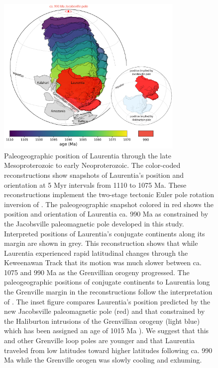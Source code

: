 \documentclass[draft]{agujournal2019}
\begin{document}
\begin{figure}[h!]
\centering
\includegraphics[width=0.8\textwidth]{Jacobsville_paleogeography.pdf}
\caption{Paleogeographic position of Laurentia through the late Mesoproterozoic to early Neoproterozoic. The color-coded reconstructions show snapshots of Laurentia's position and orientation at 5 Myr intervals from 1110 to 1075 Ma. These reconstructions implement the two-stage tectonic Euler pole rotation inversion of . The paleogeographic snapshot colored in red shows the position and orientation of Laurentia ca. 990 Ma as constrained by the Jacobsville paleomagnetic pole developed in this study. Interpreted positions of Laurentia's conjugate continents along its margin are shown in grey. This reconstruction shows that while Laurentia experienced rapid latitudinal changes through the Keweenawan Track that its motion was much slower between ca. 1075 and 990 Ma as the Grenvillian orogeny progressed. The paleogeographic positions of conjugate continents to Laurentia long the Grenville margin in the reconstructions follow the interpretation of . The inset figure compares Laurentia's position predicted by the new Jacobsville paleomagnetic pole (red) and that constrained by the Haliburton intrusions of the Grenvillian orogeny (light blue) which has been assigned an age of 1015 Ma \cite{Warnock2000a}). We suggest that this and other Grenville loop poles are younger and that Laurentia traveled from low latitudes toward higher latitudes following ca. 990 Ma while the Grenville orogen was slowly cooling and exhuming.}
\label{fig:paleogeography}
\end{figure}
\end{document}

